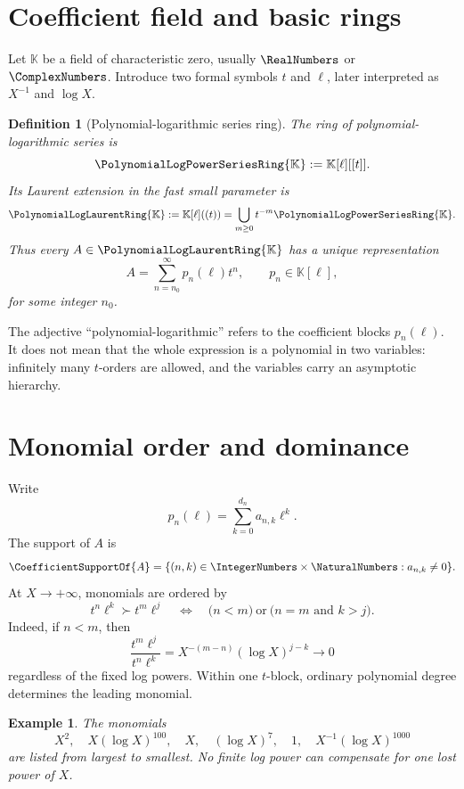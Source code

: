 \documentclass[11pt,oneside,openany]{book}
\newtheorem{definition}[theorem]{Definition}
\newtheorem{example}[theorem]{Example}
\newcommand{\K}{\mathbb{K}}
\newcommand{\Rring}{\PolynomialLogPowerSeriesRing{\K}}
\newcommand{\Pring}{\PolynomialLogLaurentRing{\K}}
\begin{document}
\section{Coefficient field and basic rings}
Let \(\K\) be a field of characteristic zero, usually \(\RealNumbers\) or
\(\ComplexNumbers\).  Introduce two formal symbols \(t\) and \(\ell\), later
interpreted as \(X^{-1}\) and \(\log X\).

\begin{definition}[Polynomial-logarithmic series ring]
The ring of polynomial-logarithmic series is
\begin{equation}\label{eq:Rring}
  \Rring:=\K[\ell][[t]].
\end{equation}
Its Laurent extension in the fast small parameter is
\begin{equation}\label{eq:Pring}
  \Pring:=\K[\ell]((t))
  =\bigcup_{m\geq0}t^{-m}\Rring.
\end{equation}
Thus every \(A\in\Pring\) has a unique representation
\begin{equation}\label{eq:uniqueexp}
  A=\sum_{n=n_0}^{\infty}p_n(\ell)t^n,
  \qquad p_n\in\K[\ell],
\end{equation}
for some integer \(n_0\).
\end{definition}

The adjective ``polynomial-logarithmic'' refers to the coefficient blocks
\(p_n(\ell)\).  It does not mean that the whole expression is a polynomial in
two variables: infinitely many \(t\)-orders are allowed, and the variables
carry an asymptotic hierarchy.

\section{Monomial order and dominance}
Write
\[
  p_n(\ell)=\sum_{k=0}^{d_n}a_{n,k}\ell^k.
\]
The support of \(A\) is
\[
  \CoefficientSupportOf{A}=\{(n,k)\in\IntegerNumbers\times\NaturalNumbers:a_{n,k}\neq0\}.
\]
At \(X\to+\infty\), monomials are ordered by
\begin{equation}\label{eq:domorder}
 t^n\ell^k\succ t^m\ell^j
 \quad\Longleftrightarrow\quad
 \bigl(n<m\bigr)
 \ \text{or}\ 
 \bigl(n=m\text{ and }k>j\bigr).
\end{equation}
Indeed, if \(n<m\), then
\[
 \frac{t^m\ell^j}{t^n\ell^k}
 =X^{-(m-n)}(\log X)^{j-k}\longrightarrow0
\]
regardless of the fixed log powers.  Within one \(t\)-block, ordinary
polynomial degree determines the leading monomial.

\begin{example}
The monomials
\[
  X^2,
  \quad X(\log X)^{100},
  \quad X,
  \quad (\log X)^7,
  \quad 1,
  \quad X^{-1}(\log X)^{1000}
\]
are listed from largest to smallest.  No finite log power can compensate for
one lost power of \(X\).
\end{example}
\end{document}
